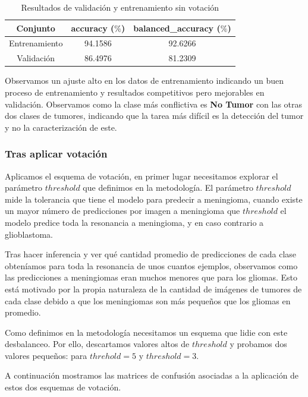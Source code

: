 \begin{table}[H]
	\centering
	\begin{tabular}{|ccc|}
		\toprule
		Conjunto & accuracy ($\%$) & balanced\_accuracy ($\%$) \\
		\midrule
		Entrenamiento & 94.1586 & 92.6266 \\ 
		Validación & 86.4976 & 81.2309 \\ 
		\bottomrule
	\end{tabular}
	\caption{Resultados de validación y entrenamiento sin votación}
	\label{tabla:resultados10}
\end{table}

Observamos un ajuste alto en los datos de entrenamiento indicando un buen proceso de entrenamiento y resultados competitivos pero mejorables en validación. Observamos como la clase más conflictiva es \textbf{No Tumor} con las otras dos clases de tumores, indicando que la tarea más difícil es la detección del tumor y no la caracterización de este.

\subsubsection{Tras aplicar votación}

Aplicamos el esquema de votación, en primer lugar necesitamos explorar el parámetro $threshold$ que definimos en la metodología. El parámetro $threshold$ mide la tolerancia que tiene el modelo para predecir a meningioma, cuando existe un mayor número de predicciones por imagen a meningioma que $threshold$ el modelo predice toda la resonancia a meningioma, y en caso contrario a glioblastoma.

Tras hacer inferencia y ver qué cantidad promedio de predicciones de cada clase obteníamos para toda la resonancia de unos cuantos ejemplos, observamos como las predicciones a meningiomas eran muchos menores que para los gliomas. Esto está motivado por la propia naturaleza de la cantidad de imágenes de tumores de cada clase debido a que los meningiomas son más pequeños que los gliomas en promedio. 

Como definimos en la metodología necesitamos un esquema que lidie con este desbalanceo. Por ello, descartamos valores altos de $threshold$ y probamos dos valores pequeños: para $threhold = 5$ y $threshold = 3$.

A continuación mostramos las matrices de confusión asociadas a la aplicación de estos dos esquemas de votación.

